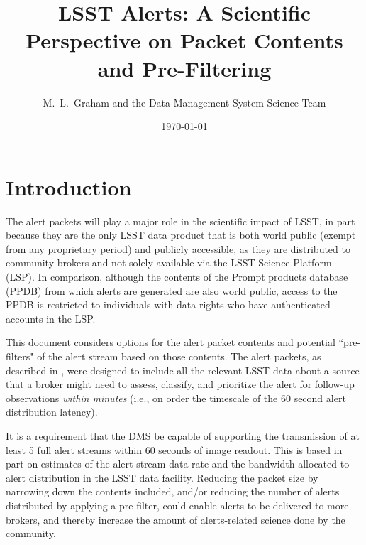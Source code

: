 \documentclass[DM,lsstdraft,authoryear,toc]{lsstdoc}
\title[Alerts Contents]{LSST Alerts: A Scientific Perspective on Packet Contents and Pre-Filtering}
\author{%
M.~L.~Graham and the Data Management System Science Team
}
\date{\today}
\begin{document}

\maketitle

\section{Introduction} \label{sec:intro}


The alert packets will play a major role in the scientific impact of LSST, in part because they are the only LSST data product that is both world public (exempt from any proprietary period) and publicly accessible, as they are distributed to community brokers and not solely available via the LSST Science Platform (LSP).
In comparison, although the contents of the Prompt products database (PPDB) from which alerts are generated are also world public, access to the PPDB is restricted to individuals with data rights  who have authenticated accounts in the LSP.

This document considers options for the alert packet contents and potential ``pre-filters" of the alert stream based on those contents. 
The alert packets, as described in , were designed to include all the relevant LSST data about a source that a broker might need to assess, classify, and prioritize the alert for follow-up observations \emph{within minutes} (i.e., on order the timescale of the 60 second alert distribution latency).

It is a requirement that the DMS be capable of supporting the transmission of at least 5 full alert streams within 60 seconds of image readout.
This is based in part on estimates of the alert stream data rate and the bandwidth allocated to alert distribution in the LSST data facility.
Reducing the packet size by narrowing down the contents included, and/or reducing the number of alerts distributed by applying a pre-filter, could enable alerts to be delivered to more brokers, and thereby increase the amount of alerts-related science done by the community.
\end{document}
